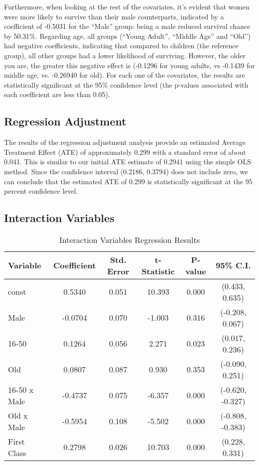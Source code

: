 \documentclass[12pt]{article}
\begin{document}
Furthermore, when looking at the rest of the covariates, it’s evident that women were more likely to survive than their male counterparts, indicated by a coefficient of -0.5031 for the “Male” group: being a male reduced survival chance by 50.31\%. Regarding age, all groups (“Young Adult”, “Middle Age” and “Old”) had negative coefficients, indicating that compared to children (the reference group), all other groups had a lower likelihood of surviving. However, the older you are, the greater this negative effect is (-0.1296 for young adults, vs -0.1439 for middle age, vs. -0.26940 for old). For each one of the covariates, the results are statistically significant at the 95\% confidence level (the p-values associated with each coefficient are less than 0.05). 

\subsection{Regression Adjustment}
\doublespacing
The results of the regression adjustment analysis provide an estimated Average Treatment Effect (ATE) of approximately 0.299 with a standard error of about 0.041. This is similar to our initial ATE estimate of 0.2941 using the simple OLS method. Since the confidence interval (0.2186, 0.3794) does not include zero, we can conclude that the estimated ATE of 0.299 is statistically significant at the 95 percent confidence level.

\subsection{Interaction Variables}
\doublespacing

\begin{table}[H]
\centering
\caption{Interaction Variables Regression Results}
\begin{tabular}{lccccc}
\toprule
Variable & Coefficient & Std. Error & t-Statistic & P-value & 95\% C.I. \\ 
\midrule
const & 0.5340 & 0.051 & 10.393 & 0.000 & (0.433, 0.635) \\
Male & -0.0704 & 0.070 & -1.003 & 0.316 & (-0.208, 0.067) \\
16-50 & 0.1264 & 0.056 & 2.271 & 0.023 & (0.017, 0.236) \\
Old & 0.0807 & 0.087 & 0.930 & 0.353 & (-0.090, 0.251) \\
16-50 x Male & -0.4737 & 0.075 & -6.357 & 0.000 & (-0.620, -0.327) \\
Old x Male & -0.5954 & 0.108 & -5.502 & 0.000 & (-0.808, -0.383) \\
First Class & 0.2798 & 0.026 & 10.703 & 0.000 & (0.228, 0.331) \\
\bottomrule
\end{tabular}
\end{table}
\end{document}
